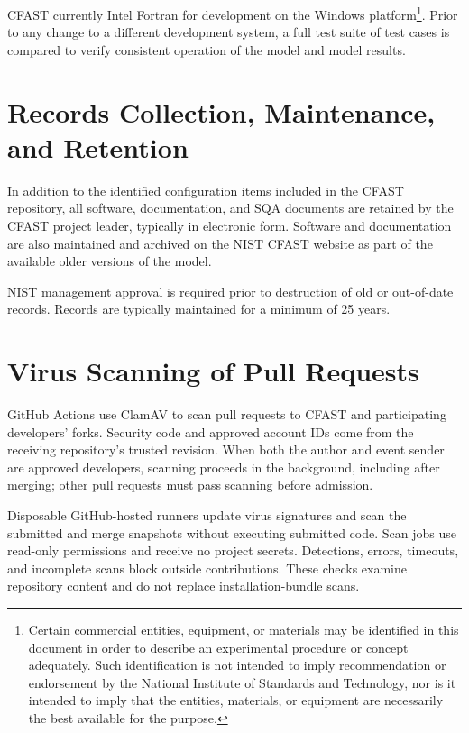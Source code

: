 \documentclass[12pt]{book}
\begin{document}
CFAST currently Intel Fortran for development on the Windows platform\footnote{Certain commercial entities, equipment, or materials may be identified in this document in order to describe an experimental procedure or concept adequately. Such identification is not intended to imply recommendation or endorsement by the National Institute of Standards and Technology, nor is it intended to imply that the entities, materials, or equipment are necessarily the best available for the purpose.}.  Prior to any change to a different development system, a full test suite of test cases is compared to verify consistent operation of the model and model results.

\section{Records Collection, Maintenance, and Retention}

In addition to the identified configuration items included in the CFAST repository, all software, documentation, and SQA documents are retained by the CFAST project leader, typically in electronic form. Software and documentation are also maintained and archived on the NIST CFAST website as part of the available older versions of the model.

NIST management approval is required prior to destruction of old or out-of-date records. Records are typically maintained for a minimum of 25 years.

\section[Virus Scanning of Pull Requests]{Virus Scanning of Pull Requests}
\label{sec:pr_screening}

GitHub Actions use ClamAV to scan pull requests to CFAST and participating developers' forks. Security code and approved account IDs come from the receiving repository's trusted revision. When both the author and event sender are approved developers, scanning proceeds in the background, including after merging; other pull requests must pass scanning before admission.

Disposable GitHub-hosted runners update virus signatures and scan the submitted and merge snapshots without executing submitted code. Scan jobs use read-only permissions and receive no project secrets. Detections, errors, timeouts, and incomplete scans block outside contributions. These checks examine repository content and do not replace installation-bundle scans.
\end{document}
